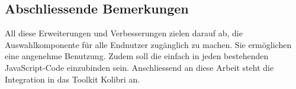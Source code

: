 \subsection{Abschliessende Bemerkungen}
\label{sec:endSumup}

All diese Erweiterungen und Verbesserungen zielen darauf ab, die Auswahlkomponente für alle Endnutzer zugänglich zu machen. 
Sie ermöglichen eine angenehme Benutzung. 
Zudem soll die  einfach in jeden bestehenden JavaScript-Code einzubinden sein. 
Anschliessend an diese Arbeit steht die Integration in das Toolkit Kolibri an. 
